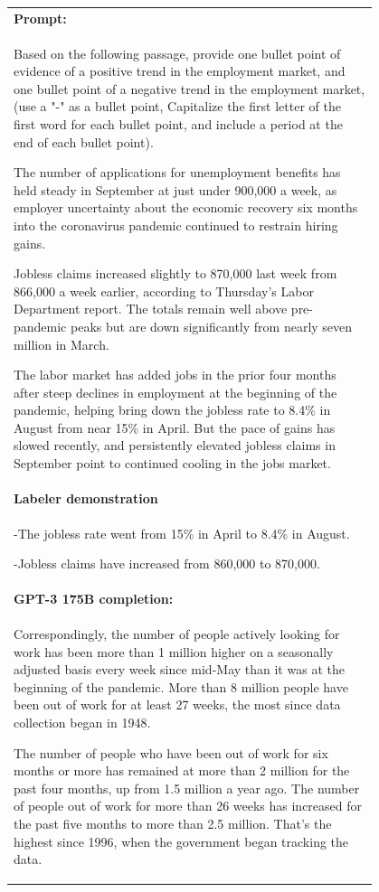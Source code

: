 \documentclass{article}
\begin{document}
\begin{figure}[hp]
    \centering
    \small
    \begin{tabular}{p{0.95\linewidth}}
    \toprule 
        \textbf{Prompt:}   \\
         Based on the following passage, provide one bullet point of evidence of a positive trend in the employment market, and one bullet point of a negative trend in the employment market, (use a "-" as a bullet point, Capitalize the first letter of the first word for each bullet point, and include a period at the end of each bullet point).

The number of applications for unemployment benefits has held steady in September at just under 900,000 a week, as employer uncertainty about the economic recovery six months into the coronavirus pandemic continued to restrain hiring gains.

Jobless claims increased slightly to 870,000 last week from 866,000 a week earlier, according to Thursday’s Labor Department report. The totals remain well above pre-pandemic peaks but are down significantly from nearly seven million in March.

The labor market has added jobs in the prior four months after steep declines in employment at the beginning of the pandemic, helping bring down the jobless rate to 8.4\% in August from near 15\% in April. But the pace of gains has slowed recently, and persistently elevated jobless claims in September point to continued cooling in the jobs market.   \\ \midrule
\textbf{Labeler demonstration}\\ 
-The jobless rate went from 15\% in April to 8.4\% in August. 

-Jobless claims have increased from 860,000 to 870,000.
\\ \midrule 
        \textbf{GPT-3 175B completion:} \\
        
         Correspondingly, the number of people actively looking for work has been more than 1 million higher on a seasonally adjusted basis every week since mid-May than it was at the beginning of the pandemic. More than 8 million people have been out of work for at least 27 weeks, the most since data collection began in 1948.

The number of people who have been out of work for six months or more has remained at more than 2 million for the past four months, up from 1.5 million a year ago. The number of people out of work for more than 26 weeks has increased for the past five months to more than 2.5 million. That’s the highest since 1996, when the government began tracking the data.


\end{tabular}
\end{figure}
\end{document}
